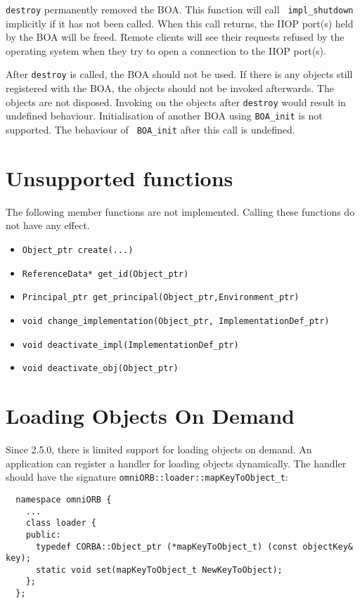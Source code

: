 \documentclass[11pt,twoside,onecolumn]{book}
\begin{document}
{\tt destroy} permanently removed the BOA. This function will call {\tt
impl\_shutdown} implicitly if it has not been called. When this call
returns, the IIOP port(s) held by the BOA will be freed. Remote clients
will see their requests refused by the operating system when they try to
open a connection to the IIOP port(s). 

After {\tt destroy} is called, the BOA should not be used. If there is any
objects still registered with the BOA, the objects should not be invoked
afterwards. The objects are not disposed. Invoking on the objects after
{\tt destroy} would result in undefined behaviour. Initialisation of
another BOA using {\tt BOA\_init} is not supported. The behaviour of {\tt
BOA\_init} after this call is undefined.

\section{Unsupported functions}

The following member functions are not implemented. Calling these functions
do not have any effect.

\begin{itemize}
\item {\tt Object\_ptr create(...)}
\item {\tt ReferenceData* get\_id(Object\_ptr)}
\item {\tt Principal\_ptr get\_principal(Object\_ptr,Environment\_ptr)}
\item {\tt void change\_implementation(Object\_ptr, ImplementationDef\_ptr)}
\item {\tt void deactivate\_impl(ImplementationDef\_ptr)}
\item {\tt void deactivate\_obj(Object\_ptr)}
\end{itemize}


\section{Loading Objects On Demand}
\label{load_on_demand}

Since 2.5.0, there is limited support for loading objects on demand. 
An application can register a handler for loading objects dynamically. The
handler should have the signature {\tt omniORB::loader::mapKeyToObject\_t}:

{\small
\begin{verbatim}
  namespace omniORB {
    ...
    class loader {
    public:
      typedef CORBA::Object_ptr (*mapKeyToObject_t) (const objectKey& key);
      static void set(mapKeyToObject_t NewKeyToObject);
    };
  };
\end{verbatim}
}
\end{document}
